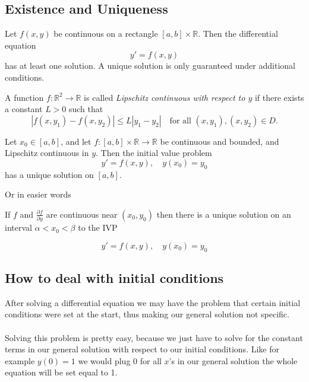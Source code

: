 \begin{center}
\end{center}

\subsection{Existence and Uniqueness}

Let \( f(x, y) \) be continuous on a rectangle \( [a, b] \times \mathbb{R} \). Then the differential equation
\[
y' = f(x, y)
\]
has at least one solution. A unique solution is only guaranteed under additional conditions.

A function \( f : \mathbb{R}^2 \to \mathbb{R} \) is called \emph{Lipschitz continuous with respect to \( y \)} if there exists a constant \( L > 0 \) such that
\[
|f(x, y_1) - f(x, y_2)| \leq L |y_1 - y_2|
\quad \text{for all } (x, y_1), (x, y_2) \in D.
\]

Let \( x_0 \in [a, b] \), and let \( f : [a, b] \times \mathbb{R} \to \mathbb{R} \) be continuous and bounded, and Lipschitz continuous in \( y \). Then the initial value problem
\[
y' = f(x, y), \quad y(x_0) = y_0
\]
has a unique solution on \( [a, b] \).

Or in easier words

If \(f\) and \(\frac{\partial f}{\partial y}\) are continuous near \((x_0, y_0)\) then
there is a unique solution on an interval \(\alpha < x_0 < \beta\) to the IVP

\[y' = f(x,y), \quad y(x_0) = y_0\]

\subsection{How to deal with initial conditions}

After solving a differential equation we may have the problem that certain initial
conditions were set at the start, thus making our general solution not specific.
\\\\
Solving this problem is pretty easy, because we just have to solve for the constant terms
in our general solution with respect to our initial conditions. Like for example \(y(0) = 1\)
we would plug 0 for all \(x\)'s in our general solution the whole equation will be set equal to 1.

